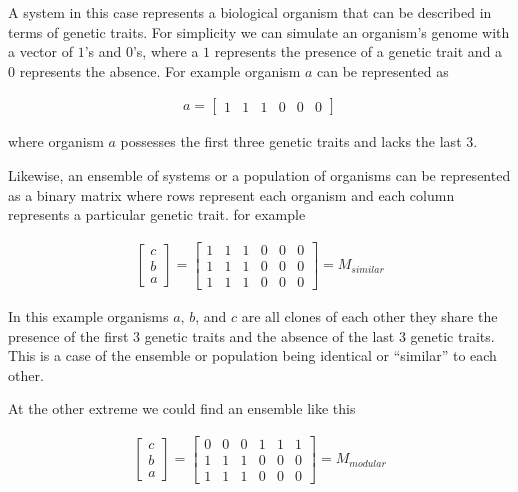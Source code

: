 \documentclass[
  letterpaper,
  DIV=11,
  numbers=noendperiod]{scrartcl}
\begin{document}
A system in this case represents a biological organism that can be
described in terms of genetic traits. For simplicity we can simulate an
organism's genome with a vector of \(1\)'s and \(0\)'s, where a \(1\)
represents the presence of a genetic trait and a \(0\) represents the
absence. For example organism \(a\) can be represented as

\begin{align*}
a = \begin{bmatrix}1&1&1&0&0&0\end{bmatrix}
\end{align*}

where organism \(a\) possesses the first three genetic traits and lacks
the last 3.

Likewise, an ensemble of systems or a population of organisms can be
represented as a binary matrix where rows represent each organism and
each column represents a particular genetic trait. for example

\begin{align*}
\begin{bmatrix}c\\b\\a\end{bmatrix} = \begin{bmatrix}1&1&1&0&0&0\\1&1&1&0&0&0\\1&1&1&0&0&0\end{bmatrix} = M_{similar}
\end{align*}

In this example organisms \(a\), \(b\), and \(c\) are all clones of each
other they share the presence of the first 3 genetic traits and the
absence of the last 3 genetic traits. This is a case of the ensemble or
population being identical or ``similar'' to each other.

At the other extreme we could find an ensemble like this

\begin{align*}
\begin{bmatrix}c\\b\\a\end{bmatrix} = \begin{bmatrix}0&0&0&1&1&1\\1&1&1&0&0&0\\1&1&1&0&0&0\end{bmatrix} =  M_{modular}
\end{align*}
\end{document}
